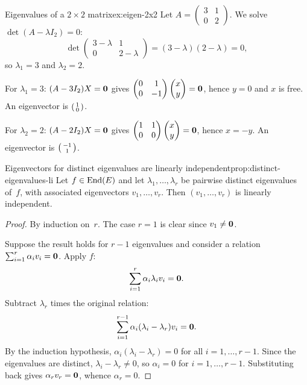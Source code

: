 \begin{example}{Eigenvalues of a $2\times 2$ matrix}{ex:eigen-2x2}
Let $A = \begin{pmatrix} 3 & 1 \\ 0 & 2 \end{pmatrix}$.  We solve
$\det(A - \lambda I_2) = 0$:
\[
  \det\begin{pmatrix} 3-\lambda & 1 \\ 0 & 2-\lambda \end{pmatrix}
  = (3-\lambda)(2-\lambda) = 0,
\]
so $\lambda_1 = 3$ and $\lambda_2 = 2$.

For $\lambda_1 = 3$: $(A - 3I_2)X = \mathbf{0}$ gives
$\begin{pmatrix} 0 & 1 \\ 0 & -1 \end{pmatrix}
\begin{pmatrix} x \\ y \end{pmatrix} = \mathbf{0}$,
hence $y = 0$ and $x$ is free.  An eigenvector is
$\begin{psmallmatrix} 1 \\ 0 \end{psmallmatrix}$.

For $\lambda_2 = 2$: $(A - 2I_2)X = \mathbf{0}$ gives
$\begin{pmatrix} 1 & 1 \\ 0 & 0 \end{pmatrix}
\begin{pmatrix} x \\ y \end{pmatrix} = \mathbf{0}$,
hence $x = -y$.  An eigenvector is
$\begin{psmallmatrix} -1 \\ 1 \end{psmallmatrix}$.
\end{example}

\begin{proposition}{Eigenvectors for distinct eigenvalues are linearly
independent}{prop:distinct-eigenvalues-li}
Let $f\in\operatorname{End}(E)$ and let $\lambda_1,\ldots,\lambda_r$ be pairwise
distinct eigenvalues of~$f$, with associated eigenvectors
$v_1,\ldots,v_r$.  Then $(v_1,\ldots,v_r)$ is linearly independent.
\end{proposition}

\begin{proof}
By induction on~$r$.  The case $r=1$ is clear since $v_1\neq\mathbf{0}$.

Suppose the result holds for $r-1$ eigenvalues and consider a
relation $\sum_{i=1}^{r}\alpha_i v_i = \mathbf{0}$.  Apply $f$:
\[
  \sum_{i=1}^{r}\alpha_i \lambda_i v_i = \mathbf{0}.
\]
Subtract $\lambda_r$ times the original relation:
\[
  \sum_{i=1}^{r-1}\alpha_i(\lambda_i - \lambda_r) v_i = \mathbf{0}.
\]
By the induction hypothesis, $\alpha_i(\lambda_i - \lambda_r) = 0$
for all $i = 1,\ldots,r-1$.  Since the eigenvalues are distinct,
$\lambda_i - \lambda_r \neq 0$, so $\alpha_i = 0$ for
$i = 1,\ldots,r-1$.  Substituting back gives $\alpha_r v_r = \mathbf{0}$,
whence $\alpha_r = 0$.
\end{proof}

